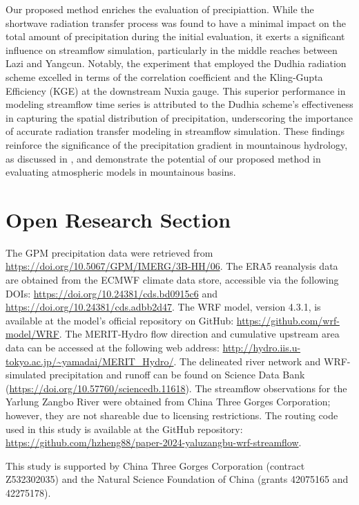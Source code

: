 \documentclass[draft]{agujournal2019}
\begin{document}
Our proposed method enriches the evaluation of precipiattion. While the shortwave radiation transfer process was found to have a minimal impact on the total amount of precipitation during the initial evaluation, it exerts a significant influence on streamflow simulation, particularly in the middle reaches between Lazi and Yangcun. Notably, the experiment that employed the Dudhia radiation scheme excelled in terms of the correlation coefficient and the Kling-Gupta Efficiency (KGE) at the downstream Nuxia gauge. This superior performance in modeling streamflow time series is attributed to the Dudhia scheme's effectiveness in capturing the spatial distribution of precipitation, underscoring the importance of accurate radiation transfer modeling in streamflow simulation. These findings reinforce the significance of the precipitation gradient in mountainous hydrology, as discussed in \cite{immerzeel2014WRR}, and demonstrate the potential of our proposed method in evaluating atmospheric models in mountainous basins.

\section*{Open Research Section}

The GPM precipitation data were retrieved from \url{https://doi.org/10.5067/GPM/IMERG/3B-HH/06}. The ERA5 reanalysis data are obtained from the ECMWF climate data store, accessible via the following DOIs: \url{https://doi.org/10.24381/cds.bd0915c6} and \url{https://doi.org/10.24381/cds.adbb2d47}. The WRF model, version 4.3.1, is available at the model's official repository on GitHub: \url{https://github.com/wrf-model/WRF}. The MERIT-Hydro flow direction and cumulative upstream area data can be accessed at the following web address: \url{http://hydro.iis.u-tokyo.ac.jp/~yamadai/MERIT_Hydro/}. The delineated river network and WRF-simulated precipitation and runoff can be found on Science Data Bank (\url{https://doi.org/10.57760/sciencedb.11618}). The streamflow observations for the Yarlung Zangbo River were obtained from China Three Gorges Corporation; however, they are not shareable due to licensing restrictions. The routing code used in this study is available at the GitHub repository: \url{https://github.com/hzheng88/paper-2024-yaluzangbu-wrf-streamflow}.

\acknowledgments

This study is supported by China Three Gorges Corporation (contract Z532302035) and the Natural Science Foundation of China (grants 42075165 and 42275178).


\end{document}
